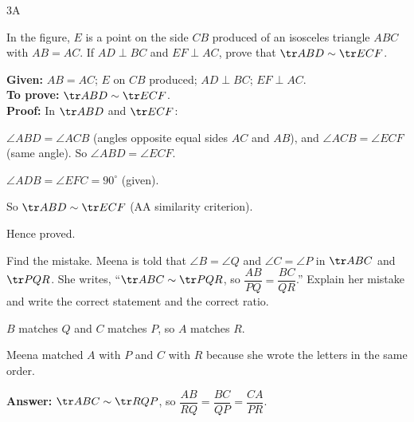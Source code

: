 \begin{exercise}{3A}
\item In the figure, $E$ is a point on the side $CB$ produced of an isosceles triangle $ABC$ with $AB=AC$. If $AD\perp BC$ and $EF\perp AC$, prove that $\tr ABD\sim\tr ECF$.
\begin{solution}
\textbf{Given:} $AB=AC$; $E$ on $CB$ produced; $AD\perp BC$; $EF\perp AC$.\\
\textbf{To prove:} $\tr ABD\sim\tr ECF$.\\
\textbf{Proof:} In $\tr ABD$ and $\tr ECF$:
\begin{steps}
  \item $\angle ABD=\angle ACB$ (angles opposite equal sides $AC$ and $AB$), and $\angle ACB=\angle ECF$ (same angle). So $\angle ABD=\angle ECF$.
  \item $\angle ADB=\angle EFC=90^\circ$ (given).
  \item So $\tr ABD\sim\tr ECF$ (AA similarity criterion).
\end{steps}
Hence proved.
\end{solution}

\item Find the mistake. Meena is told that $\angle B=\angle Q$ and $\angle C=\angle P$ in $\tr ABC$ and $\tr PQR$. She writes, ``$\tr ABC\sim\tr PQR$, so $\dfrac{AB}{PQ}=\dfrac{BC}{QR}$.'' Explain her mistake and write the correct statement and the correct ratio.
\begin{solution}
\begin{steps}
  \item $B$ matches $Q$ and $C$ matches $P$, so $A$ matches $R$.
  \item Meena matched $A$ with $P$ and $C$ with $R$ because she wrote the letters in the same order.
\end{steps}
\textbf{Answer:} $\tr ABC\sim\tr RQP$, so $\dfrac{AB}{RQ}=\dfrac{BC}{QP}=\dfrac{CA}{PR}$.
\end{solution}
\end{exercise}
